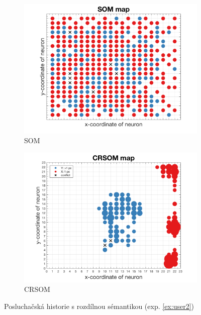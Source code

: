 \documentclass[thesis=M,czech]{FITthesis}[2012/06/26]
\begin{document}
\begin{figure}
\centering
\begin{subfigure}{.5\textwidth}
  \centering
  \includegraphics[width=.99\linewidth]{exp_user2_som.png}
  \caption{SOM}
  \label{fig:sub1}
\end{subfigure}%
\begin{subfigure}{.5\textwidth}
  \centering
  \includegraphics[width=.99\linewidth]{exp_user2_crsom.png}
  \caption{CRSOM}
  \label{fig:user2crsom}
\end{subfigure}
\caption{Posluchačská historie s rozdílnou sémantikou (exp. \ref{ex:user2})}
\label{fig:user2}
\end{figure}
\end{document}
